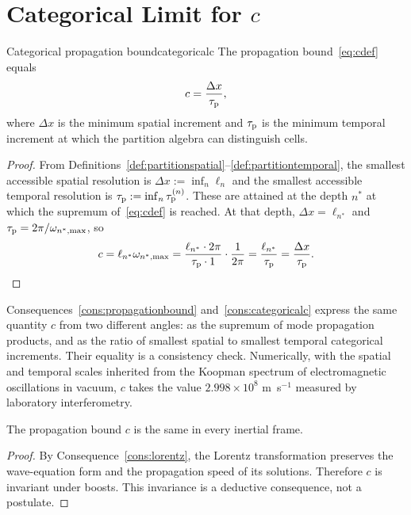 \section{Categorical Limit for $c$}
\label{sec:categoricalc}

\begin{consequence}{Categorical propagation bound}{categoricalc}
The propagation bound~\eqref{eq:cdef} equals
\begin{equation}
c=\frac{\Delta x}{\tau_{\mathrm{p}}},
\label{eq:ccategorical}
\end{equation}
where $\Delta x$ is the minimum spatial increment and $\tau_{\mathrm{p}}$ is the minimum temporal increment at which the partition algebra can distinguish cells.
\end{consequence}

\begin{proof}
From Definitions~\ref{def:partitionspatial}--\ref{def:partitiontemporal}, the smallest accessible spatial resolution is $\Delta x:=\inf_{n}\ell_{n}$ and the smallest accessible temporal resolution is $\tau_{\mathrm{p}}:=\inf_{n}\tau_{\mathrm{p}}^{(n)}$. These are attained at the depth $n^{*}$ at which the supremum of~\eqref{eq:cdef} is reached. At that depth, $\Delta x=\ell_{n^{*}}$ and $\tau_{\mathrm{p}}=2\pi/\omega_{n^{*},\max}$, so
\begin{equation*}
c=\ell_{n^{*}}\omega_{n^{*},\max}=\frac{\ell_{n^{*}}\cdot 2\pi}{\tau_{\mathrm{p}}\cdot 1}\cdot\frac{1}{2\pi}=\frac{\ell_{n^{*}}}{\tau_{\mathrm{p}}}=\frac{\Delta x}{\tau_{\mathrm{p}}}.
\end{equation*}
\end{proof}

\begin{remark}
Consequences~\ref{cons:propagationbound} and~\ref{cons:categoricalc} express the same quantity $c$ from two different angles: as the supremum of mode propagation products, and as the ratio of smallest spatial to smallest temporal categorical increments. Their equality is a consistency check. Numerically, with the spatial and temporal scales inherited from the Koopman spectrum of electromagnetic oscillations in vacuum, $c$ takes the value $2.998\times 10^{8}$ m~s$^{-1}$ measured by laboratory interferometry.
\end{remark}

\begin{corollary}
\label{cor:cframe}
The propagation bound $c$ is the same in every inertial frame.
\end{corollary}

\begin{proof}
By Consequence~\ref{cons:lorentz}, the Lorentz transformation preserves the wave-equation form and the propagation speed of its solutions. Therefore $c$ is invariant under boosts. This invariance is a deductive consequence, not a postulate.
\end{proof}

